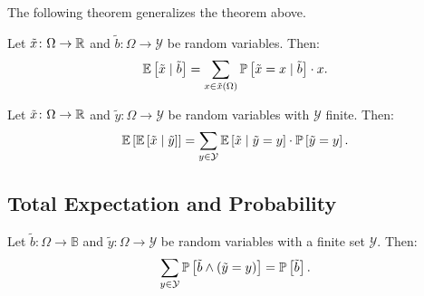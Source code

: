 The following theorem generalizes the theorem above. 
\begin{theorem}\label{thm:exp-sum-val-cnd}
Let $\tilde{x} \colon \Omega \to \mathbb{R}$ and $\tilde{b} \colon \Omega \to \mathcal{Y}$ be random variables. Then:
\[
  \mathbb{E} \left[ \tilde{x} \mid \tilde{b} \right] 
  =
  \sum_{x\in \tilde{x}(\Omega)} \mathbb{P} \left[ \tilde{x} = x \mid \tilde{b}  \right] \cdot x.
\]
\end{theorem}

\begin{theorem} \label{thm:exp-sum-val-cnd-rv}
Let $\tilde{x} \colon \Omega \to \mathbb{R}$ and $\tilde{y} \colon \Omega \to \mathcal{Y}$ be random variables with $\mathcal{Y}$ finite. Then:
\[
  \mathbb{E} \left[ \mathbb{E} \left[ \tilde{x} \mid  \tilde{y} \right] \right]
  =
  \sum_{y\in \mathcal{Y}} \mathbb{E} \left[ \tilde{x} \mid  \tilde{y} = y \right] \cdot
                       \mathbb{P}\left[ \tilde{y} = y \right].
\]
\end{theorem}


\subsection{Total Expectation and Probability}


\begin{theorem} \label{thm:total-probability}
Let $\tilde{b} \colon \Omega \to \mathbb{B}$ and $\tilde{y} \colon \Omega \to \mathcal{Y}$ be random variables with a finite set $\mathcal{Y}$. Then:
\[
\sum_{y\in \mathcal{Y}} \mathbb{P}\left[\tilde{b} \wedge (\tilde{y} = y) \right] = \mathbb{P} \left[ \tilde{b} \right].
\]
\end{theorem}


